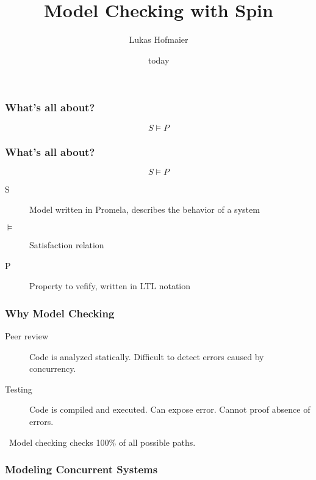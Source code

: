 \documentclass{beamer}
\title{Model Checking with Spin}
\author{Lukas Hofmaier}
\date{today}
\begin{document}
\maketitle
\begin{frame}
  \frametitle{What's all about?}
  \[
  S \models P
  \]
\end{frame}

\begin{frame}
  \frametitle{What's all about?}
  \[
  S \models P
  \]
  \begin{description}
  \item[S] Model written in Promela, describes the behavior of a system
  \item[$\models$] Satisfaction relation
  \item[P] Property to vefify, written in LTL notation
  \end{description}
\end{frame}

\begin{frame}
  \frametitle{Why Model Checking}
  \begin{description}
  \item[Peer review] Code is analyzed statically. Difficult to detect errors caused by concurrency.
  \item[Testing] Code is compiled and executed. Can expose error. Cannot proof absence of errors.
  \end{description}\
Model checking checks 100\% of all possible paths.
\end{frame}

\begin{frame}
  \frametitle{Modeling Concurrent Systems}
  
\end{frame}
\end{document}
